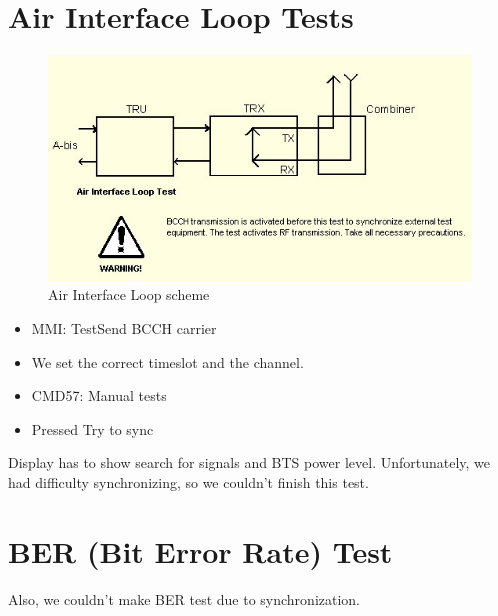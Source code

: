 \documentclass[english]{article}
\begin{document}
\section{Air Interface Loop Tests}
\begin{figure}
\centerline{\includegraphics[scale=0.8]{GSM/Pic13}}
\caption{Air Interface Loop scheme}
\end{figure}
\begin{itemize}

\item MMI: Test\/Send BCCH carrier
\item We set the correct timeslot and the channel.
\item CMD57: Manual tests
\item Pressed Try to sync
\end{itemize}
Display has to show search for signals and BTS power level. Unfortunately, we had difficulty synchronizing, so we couldn’t finish this test.
\section{BER (Bit Error Rate) Test}
Also, we couldn’t make BER test due to synchronization.
\end{document}
